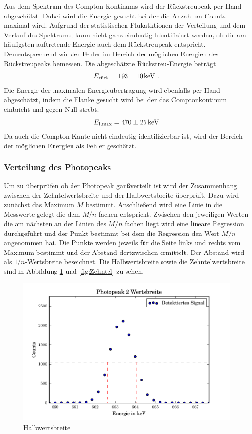 Aus dem Spektrum des Compton-Kontinums wird der Rückstreupeak per Hand abgeschätzt. Dabei wird die Energie gesucht bei der die Anzahl an Counts maximal wird. Aufgrund der statistischen Flukatktionen der Verteilung und dem Verlauf des Spektrums, kann nicht ganz eindeutig Identifiziert werden, ob die am häufigsten auftretende Energie auch dem Rückstreupeak entspricht. Dementsprechend wir der Fehler im Bereich der möglichen Energien des Rückstreupeaks bemessen. Die abgeschätzte Rückstreu-Energie beträgt 
\begin{equation}
  E_\text{rück} = \num{193 +- 10} \, \text{keV} \ .
  \label{eqn:KanExp}
\end{equation}
Die Energie der maximalen Energieübertragung wird ebenfalls per Hand abgeschätzt, indem die Flanke gesucht wird bei der das Comptonkontinum einbricht und gegen Null strebt. 
\begin{equation}
  E_\text{l,max} = \num{470 +- 25} \, \text{keV}
  \label{eqn:RückExp}
\end{equation}
Da auch die Compton-Kante nicht eindeutig identifizierbar ist, wird der Bereich der möglichen Energien als Fehler geschätzt.


\subsubsection{Verteilung des Photopeaks}
Um zu überprüfen ob der Photopeak gaußverteilt ist wird der Zusammenhang zwischen der Zehntelwertsbreite und der Halbwertsbreite überprüft. Dazu wird zunächst das Maximum $M$ bestimmt. Anschließend wird eine Linie in die Messwerte gelegt die dem $M/n$ fachen entspricht. Zwischen den jeweiligen Werten die am nächsten an der Linien des $M/n$ fachen liegt wird eine lineare Regression durchgeführt und der Punkt bestimmt bei dem die Regression den Wert $M/n$ angenommen hat. Die Punkte werden jeweils für die Seite links und rechts vom Maximum bestimmt und der Abstand dortzwischen ermittelt. Der Abstand wird als $1/n$-Wertsbreite bezeichnet.
Die Halbwertsbreite sowie die Zehntelwertsbreite sind in Abbildung \ref{fig:Halb} und \ref{fig:Zehntel} zu sehen.

\begin{figure}[h]
  \centering
  \includegraphics[width=\textwidth]{./build/2Wertsbreite.pdf}
  \caption{Halbwertsbreite}
  \label{fig:Halb}
\end{figure}

